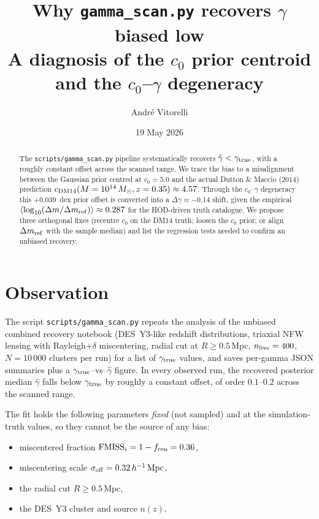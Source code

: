 \documentclass[11pt,a4paper]{article}
\title{\textbf{Why \texttt{gamma\_scan.py} recovers $\gamma$ biased low}\\[0.5em]
\large A diagnosis of the $c_0$ prior centroid and the
$c_0$--$\gamma$ degeneracy}
\author{Andr\'e Vitorelli}
\date{19 May 2026}
\newcommand{\dm}{\Delta m}
\newcommand{\dmref}{\dm_{\rm ref}}
\newcommand{\fcen}{f_{\rm cen}}
\newcommand{\sigmaoff}{\sigma_{\rm off}}
\begin{document}
\maketitle

\begin{abstract}
The \texttt{scripts/gamma\_scan.py} pipeline systematically recovers
$\hat\gamma < \gamma_{\rm true}$, with a roughly constant offset across the
scanned range.  We trace the bias to a misalignment between the Gaussian prior
centred at $c_0 = 5.0$ and the actual Dutton \& Maccio (2014) prediction
$c_{\rm DM14}(M=10^{14}\,M_\odot, z=0.35) \approx 4.57$.  Through the
$c_0$--$\gamma$ degeneracy this $+0.039$~dex prior offset is converted into a
$\Delta\gamma \approx -0.14$ shift, given the empirical
$\langle\log_{10}(\dm/\dmref)\rangle \approx 0.287$ for the HOD-driven truth
catalogue.  We propose three orthogonal fixes (recentre $c_0$ on the DM14
truth; loosen the $c_0$ prior; or align $\dmref$ with the sample median) and
list the regression tests needed to confirm an unbiased recovery.
\end{abstract}

\section{Observation}

The script
\texttt{scripts/gamma\_scan.py} repeats the analysis of the unbiased combined
recovery notebook (DES~Y3-like redshift distributions, triaxial NFW lensing
with Rayleigh+$\delta$ miscentering, radial cut at
$R\ge 0.5$\,Mpc, $n_{\rm live}=400$, $N=10\,000$ clusters per run) for a list
of $\gamma_{\rm true}$ values, and saves per-gamma JSON summaries plus a
$\gamma_{\rm true}$--vs--$\hat\gamma$ figure.  In every observed run, the
recovered posterior median $\hat\gamma$ falls below $\gamma_{\rm true}$ by
roughly a constant offset, of order $0.1$--$0.2$ across the scanned range.

The fit holds the following parameters
\emph{fixed} (not sampled) and at the simulation-truth values, so they cannot
be the source of any bias:
\begin{itemize}[noitemsep]
  \item miscentered fraction $\mathrm{FMISS}_i = 1-\fcen = 0.36$,
  \item miscentering scale $\sigmaoff = 0.32\,h^{-1}\,\mathrm{Mpc}$,
  \item the radial cut $R \ge 0.5\,\mathrm{Mpc}$,
  \item the DES~Y3 cluster and source $n(z)$.
\end{itemize}
\end{document}
